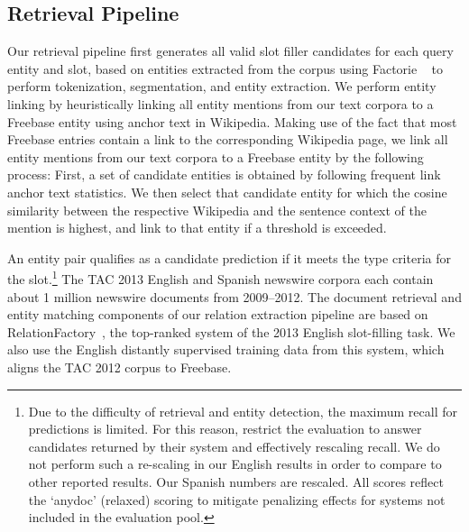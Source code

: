 
\subsection{Retrieval Pipeline \label{sec:pipeline}}
Our retrieval pipeline first generates all valid slot filler candidates for each query entity and slot, based on entities extracted from the corpus using {\sc Factorie} ~\citep{mccallum09:factorie:} to perform tokenization, segmentation, and entity extraction. We perform entity linking by heuristically linking all entity mentions from our text corpora to a Freebase entity using anchor text in Wikipedia. Making use of the fact that most Freebase entries contain a link to the corresponding Wikipedia page, we link all entity mentions from our text corpora to a Freebase entity by the following process:
First, a set of candidate entities is obtained by following frequent link anchor text statistics.
We then select that candidate entity for which the cosine similarity between the respective Wikipedia and the sentence context of the mention is highest, and link to that entity if a threshold is exceeded.

An entity pair qualifies as a candidate prediction if it meets the type criteria for the slot.\footnote{Due to the difficulty of retrieval and entity detection, the maximum recall for predictions is limited. For this reason, \citet{surdeanu2012multi} restrict the evaluation to answer candidates returned by their system and effectively rescaling recall. We do not perform such a re-scaling in our English results in order to compare to other reported results. Our Spanish numbers are rescaled. All scores reflect the `anydoc' (relaxed) scoring to mitigate penalizing effects for systems not included in the evaluation pool.} The TAC 2013 English and Spanish newswire corpora each contain about 1 million newswire documents from 2009--2012. The document retrieval and entity matching components of our relation extraction pipeline are based on RelationFactory~\citep{roth2014relationfactory}, the top-ranked system of the 2013 English slot-filling task. We also use the English distantly supervised training data from this system, which aligns the TAC 2012 corpus to Freebase.

